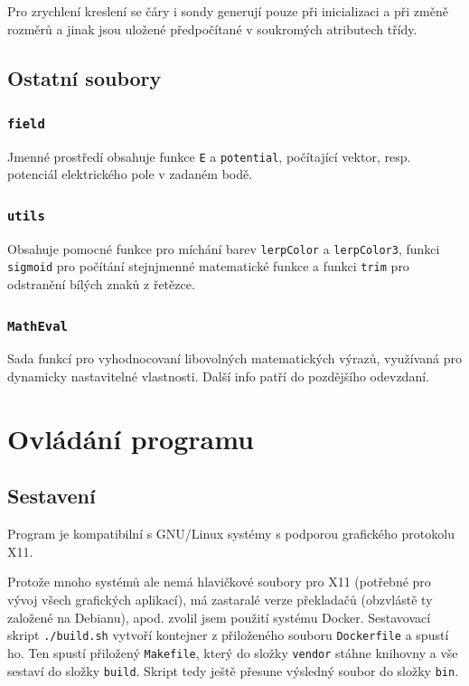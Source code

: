 \documentclass[12pt]{article}
\newcommand{\code}[1]{\mbox{\texttt{#1}}}
\begin{document}
Pro zrychlení kreslení se čáry i sondy generují pouze při inicializaci a při
změně rozměrů a jinak jsou uložené předpočítané v soukromých atributech třídy.

\subsection{Ostatní soubory}

\subsubsection{\code{field}}

Jmenné prostředí obsahuje funkce \code{E} a \code{potential}, počítající vektor,
resp. potenciál elektrického pole v zadaném bodě.

\subsubsection{\code{utils}}

Obsahuje pomocné funkce pro míchání barev \code{lerpColor} a \code{lerpColor3},
funkci \code{sigmoid} pro počítání stejnjmenné matematické funkce a funkci
\code{trim} pro odstranění bílých znaků z řetězce.

\subsubsection{\code{MathEval}}

Sada funkcí pro vyhodnocovaní libovolných matematických výrazů, využívaná pro
dynamicky nastavitelné vlastnosti. Další info patří do pozdějšího odevzdaní.

\section{Ovládání programu}

\subsection{Sestavení}

Program je kompatibilní s GNU/Linux systémy s podporou grafického protokolu X11.

Protože mnoho systémů ale nemá hlavičkové soubory pro X11 (potřebné pro vývoj
všech grafických aplikací), má zastaralé verze překladačů (obzvlástě ty založené
na Debianu), apod. zvolil jsem použití systému Docker. Sestavovací skript
\code{./build.sh} vytvoří kontejner z přiloženého souboru \code{Dockerfile} a
spustí ho. Ten spustí přiložený \code{Makefile}, který do složky \code{vendor}
stáhne knihovny a vše sestaví do složky \code{build}. Skript tedy ještě přesune
výsledný soubor do složky \code{bin}.
\end{document}
